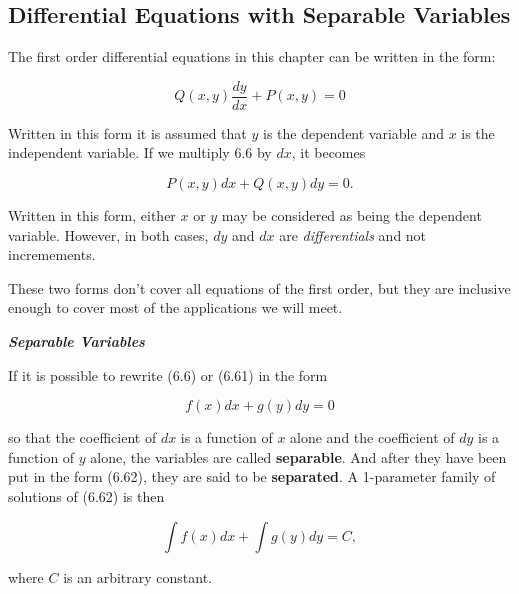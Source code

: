 \documentclass{article}
\begin{document}
\subsection{Differential Equations with Separable Variables}

The first order differential equations in this chapter can be written in the form:

\[ Q(x,y)\frac{dy}{dx} + P(x,y) = 0 \tag{6.6} \]

Written in this form it is assumed that $y$ is the dependent variable and $x$ is the independent variable. If we multiply 6.6 by $dx$, it becomes

\[ P(x,y)dx + Q(x,y)dy = 0. \tag{6.61} \]

Written in this form, either $x$ or $y$ may be considered as being the dependent variable. However, in both cases, $dy$ and $dx$ are \emph{differentials} and not incremements.

These two forms don't cover all equations of the first order, but they are inclusive enough to cover most of the applications we will meet.

\emph{\textbf{Separable Variables}}

If it is possible to rewrite (6.6) or (6.61) in the form

\[ f(x)dx + g(y)dy = 0 \tag{6.62} \]

so that the coefficient of $dx$ is a function of $x$ alone and the coefficient of $dy$ is a function of $y$ alone, the variables are called \textbf{separable}. And after they have been put in the form (6.62), they are said to be \textbf{separated}. A 1-parameter family of solutions of (6.62) is then

\[ \int f(x)dx + \int g(y)dy = C, \tag{6.63} \]

where $C$ is an arbitrary constant.
\end{document}
